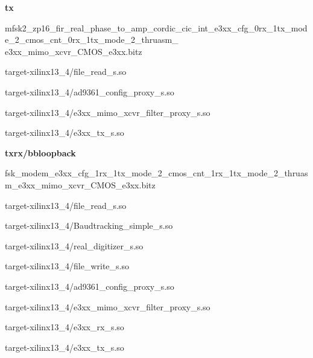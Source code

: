 	\noindent\textbf{tx}
	\begin{itemize}
  \item mfsk2\_zp16\_fir\_real\_phase\_to\_amp\_cordic\_cic\_int\_e3xx\_cfg\_0rx\_1tx\_mode\_2\_cmos\_cnt\_0rx\_1tx\_mode\_2\_thruasm\_ \\
	e3xx\_mimo\_xcvr\_CMOS\_e3xx.bitz \\

	\begin{minipage}[t]{.5\textwidth}
	\item target-xilinx13\_4/file\_read\_s.so
	\item target-xilinx13\_4/ad9361\_config\_proxy\_s.so
	\end{minipage}
	\begin{minipage}[t]{.5\textwidth}
	\item target-xilinx13\_4/e3xx\_mimo\_xcvr\_filter\_proxy\_s.so
	\item target-xilinx13\_4/e3xx\_tx\_s.so
	\end{minipage}
	\end{itemize}

	\noindent\textbf{txrx/bbloopback}
	\begin{itemize}
  \item fsk\_modem\_e3xx\_cfg\_1rx\_1tx\_mode\_2\_cmos\_cnt\_1rx\_1tx\_mode\_2\_thruasm\_e3xx\_mimo\_xcvr\_CMOS\_e3xx.bitz \\

	\begin{minipage}[t]{.5\textwidth}
	\item target-xilinx13\_4/file\_read\_s.so
	\item target-xilinx13\_4/Baudtracking\_simple\_s.so
	\item target-xilinx13\_4/real\_digitizer\_s.so
	\end{minipage}
	\begin{minipage}[t]{.5\textwidth}
	\item target-xilinx13\_4/file\_write\_s.so
	\item target-xilinx13\_4/ad9361\_config\_proxy\_s.so
	\item target-xilinx13\_4/e3xx\_mimo\_xcvr\_filter\_proxy\_s.so
	\item target-xilinx13\_4/e3xx\_rx\_s.so
	\item target-xilinx13\_4/e3xx\_tx\_s.so
	\end{minipage}
	\end{itemize}





